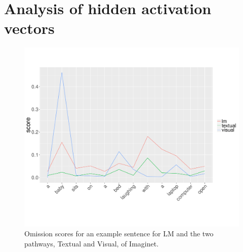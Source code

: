\section{Analysis of hidden activation vectors}
\label{sec:macro}



\begin{figure}[t]
  \centering
  \includegraphics[scale=0.3]{omissionex.pdf}
  \caption{Omission scores for an example sentence for {\sc
      LM} and the two pathways, {\sc Textual} and {\sc Visual}, of
    {\sc Imaginet.}}
  \label{fig:omissionex}
\end{figure}

